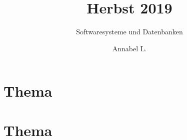 \documentclass[stex]{ddifau}
\title{Herbst 2019}
\subtitle{Softwaresysteme und Datenbanken}
\author{Annabel L.}
\begin{document}
\maketitle


\section{Thema}

\clearpage

\section{Thema}

\end{document}
